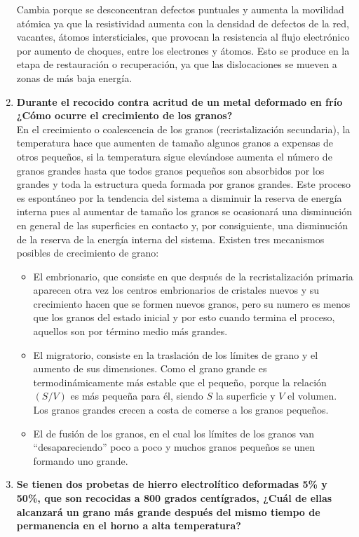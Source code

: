 \documentclass[a4paper,12pt]{report}
\begin{document}
\begin{enumerate}
Cambia porque se desconcentran defectos puntuales y aumenta la movilidad atómica ya que la resistividad aumenta con la densidad de defectos de la red, vacantes, átomos intersticiales, que provocan la resistencia al flujo electrónico por aumento de choques, entre los electrones y átomos. Esto se produce en la etapa de restauración o recuperación, ya que las dislocaciones se mueven a zonas de más baja energía.
\item \textbf{Durante el recocido contra acritud de un metal deformado en frío ¿Cómo ocurre el crecimiento de los granos?}\\
En el crecimiento o coalescencia de los granos (recristalización secundaria), la temperatura hace que aumenten de tamaño algunos granos a expensas de otros pequeños, si la temperatura sigue elevándose aumenta el número de granos grandes hasta que todos granos pequeños son absorbidos por los grandes y toda la estructura queda formada por granos grandes. Este proceso es espontáneo por la tendencia del sistema a disminuir la reserva de energía interna pues al aumentar de tamaño los granos se ocasionará una disminución en general de las superficies en contacto y, por consiguiente, una disminución de la reserva de la energía interna del sistema. Existen tres mecanismos posibles de crecimiento de grano:
\begin{itemize}
\item El embrionario, que consiste en que después de la recristalización primaria aparecen otra vez los centros embrionarios de cristales nuevos y su crecimiento hacen que se formen nuevos granos, pero su numero es menos que los granos del estado inicial y por esto cuando termina el proceso, aquellos son por término medio más grandes.
\item El migratorio, consiste en la traslación de los límites de grano y el aumento de sus dimensiones. Como el grano grande es termodinámicamente más estable que el pequeño, porque la relación $(S/V)$ es más pequeña para él, siendo $S$ la superficie y $V$ el volumen. Los granos grandes crecen a costa de comerse a los granos pequeños. 
\item El de fusión de los granos, en el cual los límites de los granos van “desapareciendo” poco a poco y muchos granos pequeños se unen formando uno grande.
\end{itemize}
\item \textbf{Se tienen dos probetas de hierro electrolítico deformadas 5\% y 50\%, que son recocidas a 800 grados centígrados, ¿Cuál de ellas alcanzará un grano más grande después del mismo tiempo de permanencia en el horno a alta temperatura?}\\

\end{enumerate}
\end{document}
